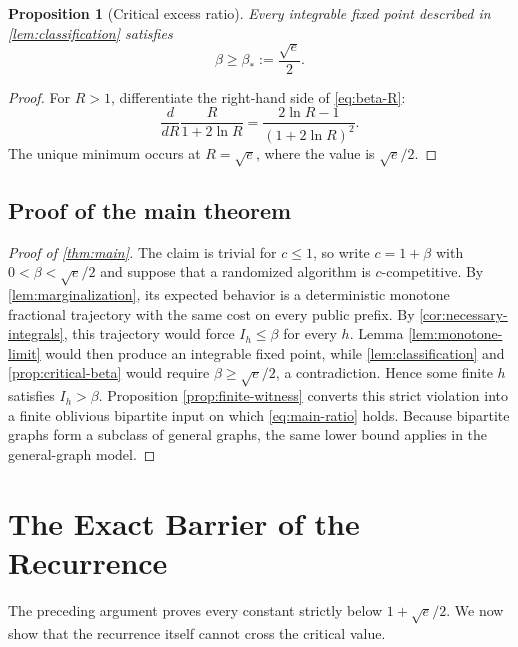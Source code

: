 \documentclass[11pt,letterpaper]{article}
\newcommand{\cref}[1]{\autoref{#1}}
\newtheorem{proposition}[theorem]{Proposition}
\theoremstyle{definition}
\theoremstyle{remark}
\begin{document}
\begin{proposition}[Critical excess ratio]\label{prop:critical-beta}
Every integrable fixed point described in \cref{lem:classification} satisfies
\begin{equation}\label{eq:beta-critical} \beta\ge\beta_*:=\frac{\sqrt e}{2}. \end{equation}
\end{proposition}

\begin{proof}
For $R>1$, differentiate the right-hand side of \cref{eq:beta-R}:
\begin{equation}\label{eq:threshold-derivative} \frac{d}{dR}\frac{R}{1+2\ln R}=\frac{2\ln R-1}{(1+2\ln R)^2}. \end{equation}
The unique minimum occurs at $R=\sqrt e$, where the value is $\sqrt e/2$.
\end{proof}

\subsection{Proof of the main theorem}

\begin{proof}[Proof of \cref{thm:main}]
The claim is trivial for $c\le1$, so write $c=1+\beta$ with $0<\beta<\sqrt e/2$ and suppose that a randomized algorithm is $c$-competitive.
By \cref{lem:marginalization}, its expected behavior is a deterministic monotone fractional trajectory with the same cost on every public prefix.
By \cref{cor:necessary-integrals}, this trajectory would force $I_h\le\beta$ for every $h$.
Lemma \ref{lem:monotone-limit} would then produce an integrable fixed point, while \autoref{lem:classification} and \autoref{prop:critical-beta} would require $\beta\ge\sqrt e/2$, a contradiction.
Hence some finite $h$ satisfies $I_h>\beta$.
Proposition \ref{prop:finite-witness} converts this strict violation into a finite oblivious bipartite input on which \cref{eq:main-ratio} holds.
Because bipartite graphs form a subclass of general graphs, the same lower bound applies in the general-graph model.
\end{proof}

\section{The Exact Barrier of the Recurrence}\label{sec:barrier}

The preceding argument proves every constant strictly below $1+\sqrt e/2$.
We now show that the recurrence itself cannot cross the critical value.
\end{document}
